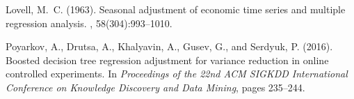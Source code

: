 \documentclass[12pt]{article}
\theoremstyle{plain}
\theoremstyle{definition}
\begin{document}
\begin{thebibliography}{}
Lovell, M.~C. (1963).
\newblock Seasonal adjustment of economic time series and multiple regression analysis.
, 58(304):993--1010.

Poyarkov, A., Drutsa, A., Khalyavin, A., Gusev, G., and Serdyuk, P. (2016).
\newblock Boosted decision tree regression adjustment for variance reduction in
  online controlled experiments.
\newblock In {\em Proceedings of the 22nd ACM SIGKDD International Conference
  on Knowledge Discovery and Data Mining}, pages 235--244.

\end{thebibliography}
\end{document}
